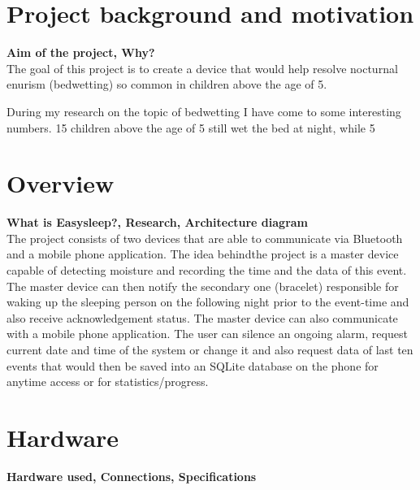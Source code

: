 \documentclass[12pt,a4paper]{article}
\begin{document}
	\section{Project background and motivation}
	{\bfseries Aim of the project, Why?}\\
	
	The goal of this project is to create a device that would help resolve nocturnal enurism (bedwetting) so common in children above the age of 5. 
	
	During my research on the topic of bedwetting I have come to some interesting numbers. 15%
	children above the age of 5 still wet the bed at night, while 5%
	\newpage
	
	\section{Overview}
	{\bfseries What is Easysleep?, Research, Architecture diagram}\\
	
	The project consists of two devices that are able to communicate via Bluetooth and a mobile phone application. The idea behindthe project is a master device capable of detecting moisture and recording the time and the data of this event. The master device can then notify the secondary one (bracelet) responsible for waking up the sleeping person on the following night prior to the event-time and also receive acknowledgement status. The master device can also communicate with a mobile phone application.  The user can silence an ongoing alarm, request current date and time of the system or change it and also request data of last ten events that would then be saved into an SQLite database on the phone for anytime access or for statistics/progress.
	\newpage
	
	\section{Hardware}
	{\bfseries Hardware used, Connections, Specifications}\\
\end{document}
